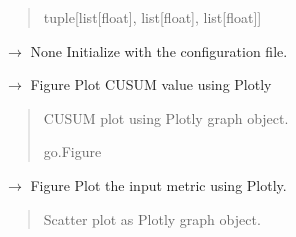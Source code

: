 \documentclass[letterpaper,10pt,oneside,english]{sphinxmanual}
\begin{document}
\begin{fulllineitems}
\begin{fulllineitems}
\begin{quote}
\begin{description}
\sphinxAtStartPar
tuple{[}list{[}float{]}, list{[}float{]}, list{[}float{]}{]}

\end{description}\end{quote}

\end{fulllineitems}


\begin{fulllineitems}
\label{\detokenize{ref_cusum:package.cusum.CUSUM.initialize}}
\pysigstartsignatures
\pysiglinewithargsret
{}
{}
{{ $\rightarrow$ None}}
\pysigstopsignatures
\sphinxAtStartPar
Initialize with the configuration file.

\end{fulllineitems}


\begin{fulllineitems}
\label{\detokenize{ref_cusum:package.cusum.CUSUM.plot_cusum_plotly}}
\pysigstartsignatures
\pysiglinewithargsret
{}
{}
{{ $\rightarrow$ Figure}}
\pysigstopsignatures
\sphinxAtStartPar
Plot CUSUM value using Plotly
\begin{quote}\begin{description}
\sphinxAtStartPar
CUSUM plot using Plotly graph object.

\sphinxAtStartPar
go.Figure

\end{description}\end{quote}

\end{fulllineitems}


\begin{fulllineitems}
\label{\detokenize{ref_cusum:package.cusum.CUSUM.plot_input_metric_plotly}}
\pysigstartsignatures
\pysiglinewithargsret
{}
{}
{{ $\rightarrow$ Figure}}
\pysigstopsignatures
\sphinxAtStartPar
Plot the input metric using Plotly.
\begin{quote}\begin{description}
\sphinxAtStartPar
Scatter plot as Plotly graph object.


\end{description}
\end{quote}
\end{fulllineitems}
\end{fulllineitems}
\end{document}
